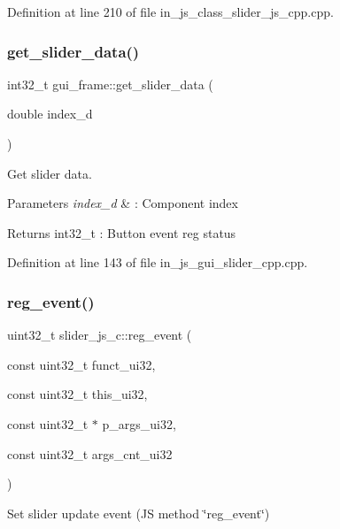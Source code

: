 Definition at line 210 of file in\+\_\+js\+\_\+class\+\_\+slider\+\_\+js\+\_\+cpp.\+cpp.

\mbox{\label{group___slider_ga0df421c260f620a2d8de8bea2bfe3554}} 
\subsubsection{get\_slider\_data()}
{\footnotesize\ttfamily int32\+\_\+t gui\+\_\+frame\+::get\+\_\+slider\+\_\+data (\begin{DoxyParamCaption}\item[{double}]{index\+\_\+d }\end{DoxyParamCaption})}



Get slider data. 


\begin{DoxyParams}{Parameters}
{\em index\+\_\+d} & \+: Component index \\
\hline
\end{DoxyParams}
\begin{DoxyReturn}{Returns}
int32\+\_\+t \+: Button event reg status 
\end{DoxyReturn}


Definition at line 143 of file in\+\_\+js\+\_\+gui\+\_\+slider\+\_\+cpp.\+cpp.

\mbox{\label{group___slider_gad3554f4f3e55ac97b562a6e262eef509}} 
\subsubsection{reg\_event()}
{\footnotesize\ttfamily uint32\+\_\+t slider\+\_\+js\+\_\+c\+::reg\+\_\+event (\begin{DoxyParamCaption}\item[{const uint32\+\_\+t}]{funct\+\_\+ui32,  }\item[{const uint32\+\_\+t}]{this\+\_\+ui32,  }\item[{const uint32\+\_\+t $\ast$}]{p\+\_\+args\+\_\+ui32,  }\item[{const uint32\+\_\+t}]{args\+\_\+cnt\+\_\+ui32 }\end{DoxyParamCaption})\hspace{0.3cm}{\ttfamily [static]}}



Set slider update event (JS method \char`\"{}reg\+\_\+event\char`\"{}) 


